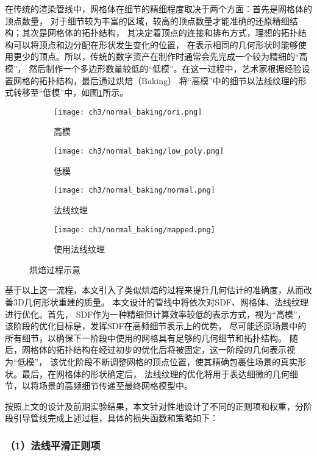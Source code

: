 在传统的渲染管线中，网格体在细节的精细程度取决于两个方面：首先是网格体的顶点数量，
对于细节较为丰富的区域，较高的顶点数量才能准确的还原精细结构；其次是网格体的拓扑结构，
其决定着顶点的连接和排布方式，理想的拓扑结构可以将顶点和边分配在形状发生变化的位置，
在表示相同的几何形状时能够使用更少的顶点。所以，传统的数字资产在制作时通常会先完成一个较为精细的“高模”，
然后制作一个多边形数量较低的“低模”。在这一过程中，艺术家根据经验设置网格的拓扑结构，最后通过烘焙（Baking）
将“高模”中的细节以法线纹理的形式转移至“低模”中，如图\ref{fig:baking_normal}所示。
\begin{figure}[H]
  \centering
  \begin{subfigure}[t]{0.24\textwidth}
    \centering
    \texttt{[image: ch3/normal\_baking/ori.png]}
    \caption{高模}
  \end{subfigure}
  \begin{subfigure}[t]{0.24\textwidth}
    \centering
    \texttt{[image: ch3/normal\_baking/low\_poly.png]}
    \caption{低模}
  \end{subfigure}
  \begin{subfigure}[t]{0.24\textwidth}
    \centering
    \texttt{[image: ch3/normal\_baking/normal.png]}
    \caption{法线纹理}
  \end{subfigure}
  \begin{subfigure}[t]{0.24\textwidth}
    \centering
    \texttt{[image: ch3/normal\_baking/mapped.png]}
    \caption{使用法线纹理}
  \end{subfigure}
  \caption{烘焙过程示意}
  \label{fig:baking_normal}
\end{figure}
基于以上这一流程，本文引入了类似烘焙的过程来提升几何估计的准确度，从而改善3D几何形状重建的质量。
本文设计的管线中将依次对SDF、网格体、法线纹理进行优化。首先，
SDF作为一种精细但计算效率较低的表示方式，视为“高模”，该阶段的优化目标是，发挥SDF在高频细节表示上的优势，
尽可能还原场景中的所有细节，以确保下一阶段中使用的网格具有足够的几何细节和拓扑结构。
随后，网格体的拓扑结构在经过初步的优化后将被固定，这一阶段的几何表示视为“低模”，
该优化阶段不断调整网格的顶点位置，使其精确包裹住场景的真实形状。最后，在网格体的形状确定后，
法线纹理的优化将用于表达细微的几何细节，以将场景的高频细节传递至最终网格模型中。

按照上文的设计及前期实验结果，本文针对性地设计了不同的正则项和权重，分阶段引导管线完成上述过程，具体的损失函数和策略如下：

\subsubsection*{（1）法线平滑正则项}

